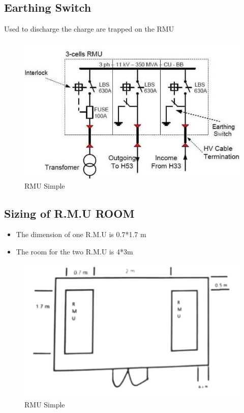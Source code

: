 \documentclass[12pt,fleqn]{book} %
\begin{document}
\subsection {Earthing Switch}
Used to discharge the charge are trapped on the RMU
\begin{figure}[h!]
    \centering
    \includegraphics[width=0.9\linewidth]{hamdy 4.png}
    \caption{RMU Simple}
    \label{fig:hamdy 4}
\end{figure}
\subsection {Sizing of R.M.U ROOM}
\begin{itemize}
    \item The dimension of one R.M.U is 0.7*1.7 m
    \item The room for the two R.M.U is 4*3m
\end{itemize}
\begin{figure}[h!]
    \centering
    \includegraphics[width=0.7\linewidth]{hamdy 5.png}
    \caption{RMU Simple}
    \label{fig:hamdy 4}
\end{figure}

\end{document}
